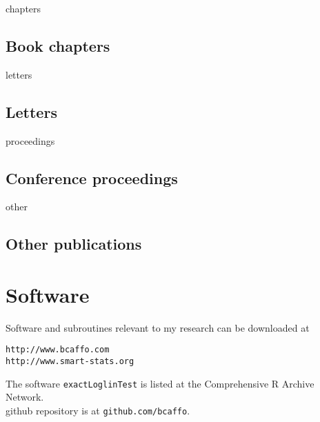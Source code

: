 \documentclass[12pt]{article}
\begin{document}
\begin{btSect}{chapters}
\subsection*{Book chapters}
\btPrintNotCited
\end{btSect}

\begin{btSect}{letters}
\subsection*{Letters}
\btPrintNotCited
\end{btSect}

\begin{btSect}{proceedings}
\subsection*{Conference proceedings}
\btPrintNotCited
\end{btSect}

\begin{btSect}{other}
\subsection*{Other publications}
\btPrintNotCited
\end{btSect}


\section*{Software}
Software and subroutines relevant to my research can be downloaded at 
 \begin{verbatim}
http://www.bcaffo.com
http://www.smart-stats.org
\end{verbatim}
The software \texttt{exactLoglinTest} is listed at the Comprehensive R Archive Network. \\
github repository is at \texttt{github.com/bcaffo}.
\end{document}
